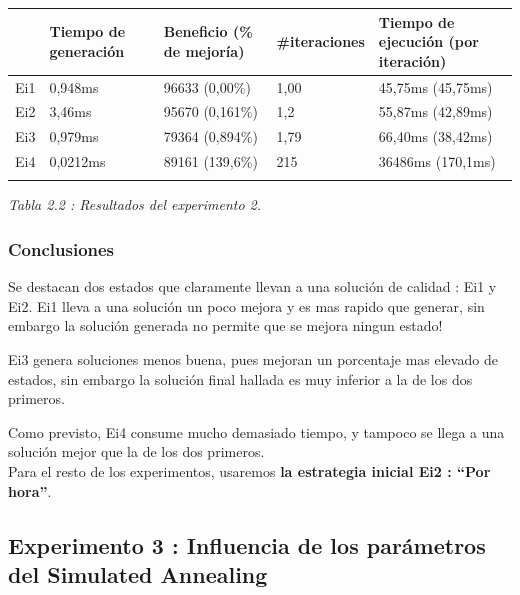 \documentclass{article}
\begin{document}
\begin{center}
\begin{tabular}{|l|l|l|l|l|}
\hline
 & Tiempo de generación & Beneficio (\% de mejoría) & \#iteraciones &
Tiempo de ejecución (por iteración)\\
\hline
Ei1 & 0,948ms & 96633 (0,00\%) & 1,00 & 45,75ms (45,75ms)\\
\hline
Ei2 & 3,46ms & 95670 (0,161\%) & 1,2 & 55,87ms (42,89ms)\\
\hline
Ei3 & 0,979ms & 79364 (0,894\%) & 1,79 & 66,40ms (38,42ms)\\
\hline
Ei4 & 0,0212ms & 89161 (139,6\%) & 215 & 36486ms (170,1ms)\\
\hline\\
\end{tabular}
{\it Tabla 2.2 : Resultados del experimento 2.}
\end{center}

\subsubsection{Conclusiones}

Se destacan dos estados que claramente llevan a una solución de calidad : Ei1 y
Ei2. Ei1 lleva a una solución un poco mejora y es mas rapido que generar, sin
embargo la solución generada no permite que se mejora ningun estado!

Ei3 genera soluciones menos buena, pues mejoran un porcentaje mas elevado de
estados, sin embargo la solución final hallada es muy inferior a la de los dos
primeros.

Como previsto, Ei4 consume mucho demasiado tiempo, y tampoco se llega a una
solución mejor que la de los dos primeros.\\

Para el resto de los experimentos, usaremos \textbf{la estrategia inicial Ei2 : 
``Por hora''}.

\subsection{Experimento 3 : Influencia de los parámetros del Simulated
Annealing}
\end{document}
